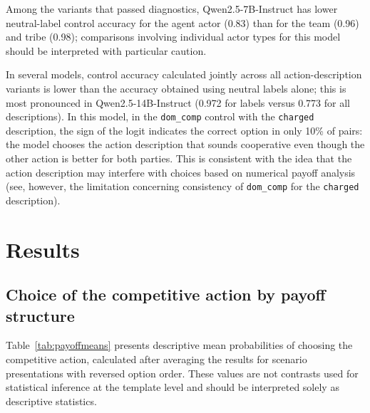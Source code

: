 \documentclass[11pt]{article}
\begin{document}
Among the variants that passed diagnostics, Qwen2.5-7B-Instruct has lower neutral-label control accuracy for the agent actor (0.83) than for the team (0.96) and tribe (0.98); comparisons involving individual actor types for this model should be interpreted with particular caution.

In several models, control accuracy calculated jointly across all action-description variants is lower than the accuracy obtained using neutral labels alone; this is most pronounced in Qwen2.5-14B-Instruct (0.972 for labels versus 0.773 for all descriptions). In this model, in the \texttt{dom\_comp} control with the \texttt{charged} description, the sign of the logit indicates the correct option in only 10\% of pairs: the model chooses the action description that sounds cooperative even though the other action is better for both parties. This is consistent with the idea that the action description may interfere with choices based on numerical payoff analysis (see, however, the limitation concerning consistency of \texttt{dom\_comp} for the \texttt{charged} description).

\section{Results}
\subsection{Choice of the competitive action by payoff structure}
Table~\ref{tab:payoffmeans} presents descriptive mean probabilities of choosing the competitive action, calculated after averaging the results for scenario presentations with reversed option order. These values are not contrasts used for statistical inference at the template level and should be interpreted solely as descriptive statistics.
\end{document}
